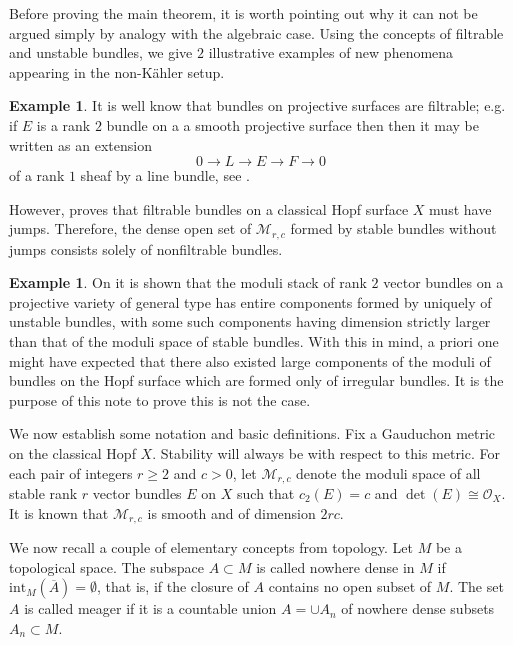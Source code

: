 \documentclass[letterpaper,10pt]{amsart}
\theoremstyle{plain}
\theoremstyle{definition}
\newtheorem{example}[theorem]{Example}
\newcommand{\enm}[1]{\ensuremath{#1}}          %
\newcommand{\cal}[1]{\mathcal{#1}}
\newcommand{\Mm}{\enm{\cal{M}}}
\newcommand{\Oo}{\enm{\cal{O}}}
\renewcommand{\to}[1][]{\xrightarrow{\ #1\ }}
\begin{document}
 Before proving the main theorem, it is worth pointing out why it can not be argued 
 simply by analogy with the algebraic case. Using the concepts of 
 filtrable and unstable bundles, we give  $2$ illustrative examples of new phenomena 
 appearing in the non-K\"ahler setup. 
 
 \begin{example} It is well know that bundles on projective surfaces are filtrable;
 e.g. if $E$ is a rank $2$ bundle on a a smooth projective surface then 
 then it may be written as an extension 
 $$0 \to L \to E \to F\to 0$$ 
 of a rank $1$ sheaf by a line bundle, see \cite[Ch., Prop.]{Fr}.
 
 However, \cite[Thm.]{BG2} proves that filtrable bundles on a classical
  Hopf surface $X$ must have jumps.
 Therefore, the dense open set of $\mathcal M_{r,c}$  formed by stable bundles without jumps 
 consists solely of nonfiltrable bundles. 
 \end{example}
 
 
 \begin{example} On \cite[App.\thinspace A]{BGRS} it is 
 shown that the moduli stack of rank $2$ vector bundles on a projective variety  of general type 
 has entire components formed by uniquely of unstable bundles, with some such components
  having dimension strictly larger than that of the moduli space of stable bundles.
  With this in mind, a priori one might have expected that there  also existed  large components
of the moduli of bundles on the Hopf surface which are  formed only  of irregular bundles.
 It is the purpose of this note to prove this is not the case.
 \end{example}
 
  We now establish some notation and basic definitions. 
Fix a Gauduchon metric on the classical Hopf $X$. Stability will always be with respect to this metric.
For each pair of integers $r\ge 2$ and $c>0$, let $\Mm_{r,c}$ denote the moduli space of all 
stable rank $r$ vector bundles $E$ on $X$ such that $c_2(E)=c$ and $\det(E)\cong \Oo_X$.
 It is known that $\Mm_{r,c}$ is smooth and of dimension $2rc$.

 We now recall a couple of elementary  concepts from topology. Let $M$ be a topological space.
 The subspace $A \subset M$ is called nowhere dense in $M$ if $\mbox{int}_M(\overline{A}) = \emptyset$, 
 that is, if the closure of $A$  contains no open subset of $M$. 
 The  set $A$ is called meager if it is a countable union $A = \cup A_n$ of nowhere dense  subsets $A_n \subset M$. 
\end{document}
